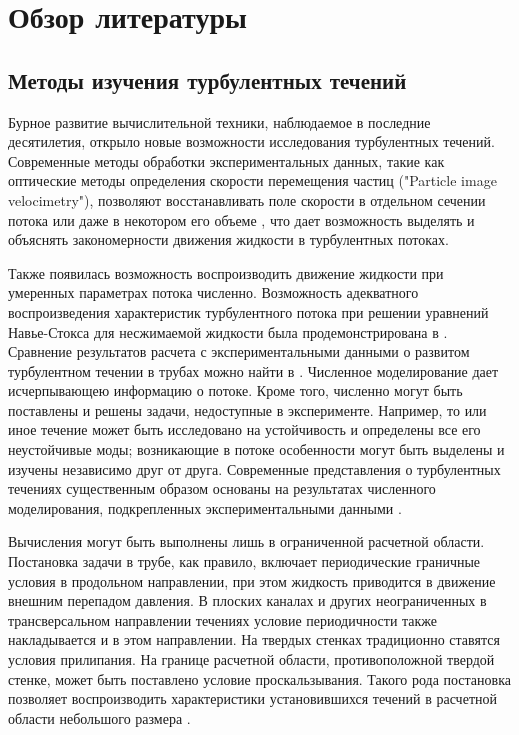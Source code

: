 
\chapter{Обзор литературы}

	
\section{Методы изучения турбулентных течений}

Бурное развитие вычислительной техники, наблюдаемое в последние десятилетия, открыло новые возможности исследования турбулентных течений. Современные методы обработки экспериментальных данных, такие как оптические методы определения скорости перемещения частиц ("Particle image velocimetry"), позволяют восстанавливать поле скорости в отдельном сечении потока или даже в некотором его объеме \cite{PIVbook}, что дает возможность выделять и объяснять закономерности движения жидкости в турбулентных потоках. 

Также появилась возможность воспроизводить движение жидкости при умеренных параметрах потока численно. Возможность адекватного воспроизведения характеристик турбулентного потока при решении уравнений Навье-Стокса для несжимаемой жидкости была продемонстрирована в \cite{Kim1987}. Сравнение результатов расчета с экспериментальными данными о развитом турбулентном течении в трубах можно найти в \cite{Priymak1998, Nikitin2006}. Численное моделирование дает исчерпывающею информацию о потоке. Кроме того, численно могут быть поставлены и решены задачи, недоступные в эксперименте. Например, то или иное течение может быть исследовано на устойчивость и определены все его неустойчивые моды; возникающие в потоке особенности могут быть выделены и изучены независимо друг от друга. Современные представления о турбулентных течениях существенным образом основаны на результатах численного моделирования, подкрепленных экспериментальными данными \cite{Manneville2015, Manneville2016}.

Вычисления могут быть выполнены лишь в ограниченной расчетной области. Постановка задачи в трубе, как правило, включает периодические граничные условия в продольном направлении, при этом жидкость приводится в движение внешним перепадом давления. В плоских каналах и других неограниченных в трансверсальном направлении течениях условие периодичности также накладывается и в этом направлении. На твердых стенках традиционно ставятся условия прилипания. На границе расчетной области, противоположной твердой стенке, может быть поставлено условие проскальзывания. Такого рода постановка позволяет воспроизводить характеристики установившихся течений в расчетной области небольшого размера \cite{Kim1987, Priymak1998, Nikitin2006}. 


